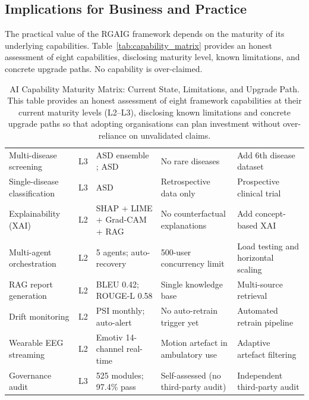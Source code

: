 \subsection{Implications for Business and Practice}

The practical value of the RGAIG framework depends on the maturity of its underlying capabilities. Table~\ref{tab:capability_matrix} provides an honest assessment of eight capabilities, disclosing maturity level, known limitations, and concrete upgrade paths. No capability is over-claimed.

\begin{table}[!htbp]
\tablestripes\tablefontsize
\tablefontsize
\caption[AI Capability Maturity Matrix: Current State,]{AI Capability Maturity Matrix: Current State, Limitations, and Upgrade Path. This table provides an honest assessment of eight framework capabilities at their current maturity levels (L2--L3), disclosing known limitations and concrete upgrade paths so that adopting organisations can plan investment without over-reliance on unvalidated claims.}
\begin{tabularx}{\textwidth}{@{} >{\raggedright\arraybackslash}p{1.6cm} p{0.7cm} L L L @{}}
\toprule
{} &  &  &  &  \\
\midrule
Multi-disease screening & L3 & ASD ensemble \asdacc{}; ASD & No rare diseases & Add 6th disease dataset \\
\addlinespace
Single-disease classification & L3 & ASD \asdacc{} & Retrospective data only & Prospective clinical trial \\
\addlinespace
Explainability (XAI) & L2 & SHAP + LIME + Grad-CAM + RAG & No counterfactual explanations & Add concept-based XAI \\
\addlinespace
Multi-agent orchestration & L2 & 5 agents; auto-recovery & 500-user concurrency limit & Load testing and horizontal scaling \\
\addlinespace
RAG report generation & L2 & BLEU 0.42; ROUGE-L 0.58 & Single knowledge base & Multi-source retrieval \\
\addlinespace
Drift monitoring & L2 & PSI monthly; auto-alert & No auto-retrain trigger yet & Automated retrain pipeline \\
\addlinespace
Wearable EEG streaming & L2 & Emotiv 14-channel real-time & Motion artefact in ambulatory use & Adaptive artefact filtering \\
\addlinespace
Governance audit & L3 & 525 modules; 97.4\% pass & Self-assessed (no third-party audit) & Independent third-party audit \\
\bottomrule
\end{tabularx}
\end{table}

